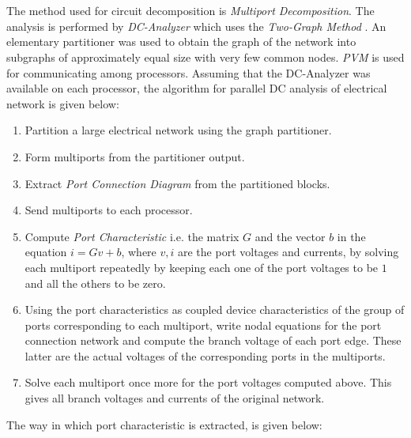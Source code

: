 \documentclass[10pt,psfig,letterpaper,twocolumn]{article}
\begin{document}
\section*{}

The method used for circuit decomposition is {\it Multiport Decomposition}. The analysis is
performed by {\it DC-Analyzer} \cite{SHBP} which uses the {\it Two-Graph Method} \cite{SHBP}. An elementary 
partitioner was used to obtain the graph of the network into subgraphs of approximately equal size with very
few common nodes. 
{\it PVM} \cite{PVM,PVMS} is used for communicating among processors. Assuming that the DC-Analyzer was available on
each processor, the algorithm for parallel DC analysis of electrical network is given below:

\begin{enumerate}
\item Partition a large electrical network using the graph partitioner. 
\item Form multiports from the partitioner output.
\item Extract {\it Port Connection Diagram} from the partitioned blocks.
\item Send multiports to each processor.
\item Compute {\it Port Characteristic} i.e. the matrix $G$ and the vector $b$ in the equation
$i=Gv+b$,  where $v,i$ are the port voltages and currents, by solving each multiport repeatedly by keeping each one of the port
voltages to be $1$ and all the others to be zero.
\item Using the port characteristics as coupled device characteristics of
the group of ports corresponding to each multiport, write nodal equations for 
the port connection network 
and compute the branch voltage of each port edge.
These latter are the actual voltages of the corresponding ports in the 
multiports. 
\item Solve each multiport once more for the port voltages
computed above. This gives all branch voltages and currents of the original
network.
\end{enumerate}
The way in which port characteristic \cite{GAK,NJB,GT} is extracted, is given below: 

\subsection*{}
\end{document}

